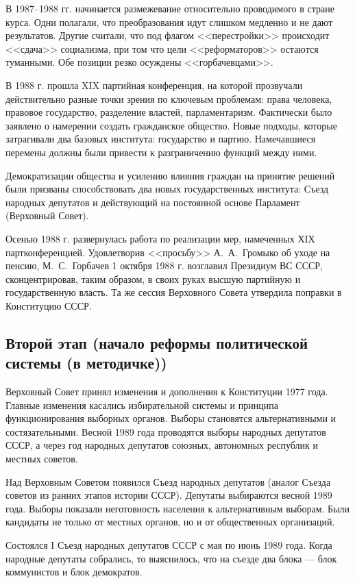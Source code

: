 В 1987--1988 гг. начинается размежевание относительно проводимого в стране курса. Одни полагали, что преобразования идут слишком медленно и не дают результатов. Другие считали, что под флагом <<перестройки>> происходит <<сдача>> социализма, при том что цели <<реформаторов>> остаются туманными. Обе позиции резко осуждены <<горбачевцами>>. 

В 1988 г. прошла XIX партийная конференция, на которой прозвучали действительно разные точки зрения по ключевым проблемам: права человека, правовое государство, разделение властей, парламентаризм. Фактически было заявлено о намерении создать гражданское общество. Новые подходы, которые затрагивали два базовых института: государство и партию. Намечавшиеся перемены должны были привести к разграничению функций между ними.

Демократизации общества и усилению влияния граждан на принятие решений были призваны способствовать два новых государственных института: Съезд народных депутатов и действующий на постоянной основе Парламент (Верховный Совет). 

Осенью 1988 г. развернулась работа по реализации мер, намеченных ХIХ партконференцией. Удовлетворив <<просьбу>> А.~А.~Громыко об уходе на пенсию, М.~С.~Горбачев 1 октября 1988 г. возглавил Президиум ВС СССР, сконцентрировав, таким образом, в своих руках высшую партийную и государственную власть. Та же сессия Верховного Совета утвердила поправки в Конституцию СССР.


\subsection{Второй этап (начало реформы политической системы (в методичке))}

Верховный Совет принял изменения и дополнения к Конституции 1977 года. Главные изменения касались избирательной системы и принципа функционирования выборных органов. Выборы становятся альтернативными и состязательными. Весной 1989 года проводятся выборы народных депутатов СССР, а через год народных депутатов союзных, автономных республик и местных советов.

Над Верховным Советом появился Съезд народных депутатов (аналог Съезда советов из ранних этапов истории СССР). Депутаты выбираются весной 1989 года. Выборы показали неготовность населения к альтернативным выборам. Были кандидаты не только от местных органов, но и от общественных организаций.

Состоялся I Съезд народных депутатов СССР с мая по июнь 1989 года. Когда народные депутаты собрались, то выяснилось, что на  съезде два блока --- блок коммунистов и блок демократов.

